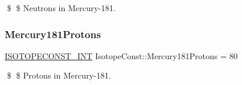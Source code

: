 \$ \$ Neutrons in Mercury-\/181. \mbox{\label{group___isotope_const-_mercury-_hg181_ga2b359f0bedffa2f92517c35d4754e5ad}} 
\subsubsection{\texorpdfstring{Mercury181\+Protons}{Mercury181Protons}}
{\footnotesize\ttfamily \mbox{\hyperlink{group___isotope_const-_macros_ga5f18360b3e99483a35c32d789e62621c}{I\+S\+O\+T\+O\+P\+E\+C\+O\+N\+S\+T\+\_\+\+I\+NT}} Isotope\+Const\+::\+Mercury181\+Protons = 80}

\$ \$ Protons in Mercury-\/181. 